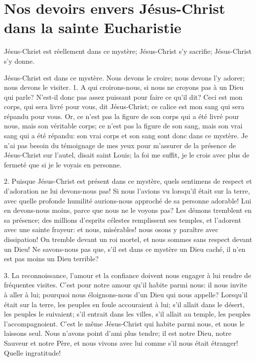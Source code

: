 \documentclass[instructions.tex]{subfiles}
\begin{document}
 
\chapter{Nos devoirs envers Jésus-Christ dans la sainte Eucharistie}
 
Jésus-Christ est réellement dans ce mystère; Jésus-Christ s’y sacrifie; Jésus-Christ s’y donne.

\primo Jésus-Christ est dans ce mystère. Nous devons le croire; nous devons l’y adorer; nous devons le visiter. 1. A qui croirons-nous, si nous ne croyons pas à un Dieu qui parle? N’est-il donc pas assez puissant pour faire ce qu’il dit? Ceci est mon corps, qui sera livré pour vous, dit Jésus-Christ; ce calice est mon sang qui sera répandu pour vous. Or, ce n’est pas la figure de son corps qui a été livré pour nous, mais son véritable corps; ce n’est pas la figure de son sang, mais son vrai sang qui a été répandu: son vrai corps et son sang sont donc dans ce mystère. Je n’ai pas besoin du témoignage de mes yeux pour m’assurer de la présence de Jésus-Christ sur l’autel, disait saint Louis; la foi me suffit, je le crois avec plus de fermeté que si je le voyais en personne.

2. Puisque Jésus-Christ est présent dans ce mystère, quels sentimens de respect et d’adoration ne lui devons-nous pas! Si nous l’avions vu lorsqu’il était sur la terre, avec quelle profonde humilité aurions-nous approché de sa personne adorable! Lui en devons-nous moins, parce que nous ne le voyons pas? Les démons tremblent en sa présence; des millions d’esprits célestes remplissent ses temples, et l’adorent avec une sainte frayeur: et nous, misérables! nous osons y paraître avec dissipation! On tremble devant un roi mortel, et nous sommes sans respect devant un Dieu!  Ne savons-nous pas que, s’il est dans ce mystère un Dieu caché, il n’en est pas moins un Dieu terrible?

3. La reconnoissance, l’amour et la confiance doivent nous engager à lui rendre de fréquentes visites. C’est pour notre amour qu’il habite parmi nous: il nous invite à aller à lui; pourquoi nous éloignons-nous d’un Dieu qui nous appelle? Lorsqu’il était sur la terre, les peuples en foule accouraient à lui; s’il allait dans le désert, les peuples le suivaient; s’il entrait dans les villes, s’il allait au temple, les peuples l’accompagnoient. C’est le même Jésus-Christ qui habite parmi nous, et nous le laissons seul. Nous n’avons point d’ami plus tendre; il est notre Dieu, notre Sauveur et notre Père, et nous vivons avec lui comme s’il nous était étranger! Quelle ingratitude!
\end{document}
